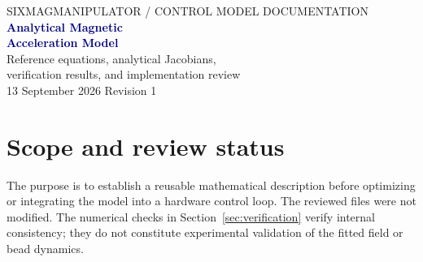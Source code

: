 \documentclass[11pt,a4paper]{article}
\numberwithin{equation}{section}
\newcommand{\code}[1]{\texttt{\detokenize{#1}}}
\begin{document}
\thispagestyle{empty}
\begin{center}
{\small\textcolor{slate}{SIXMAGMANIPULATOR \quad / \quad CONTROL MODEL DOCUMENTATION}}\\[8mm]
{\LARGE\bfseries\textcolor{navy}{Analytical Magnetic\\[2mm] Acceleration Model}}\\[5mm]
{\large Reference equations, analytical Jacobians,\\[1mm]
verification results, and implementation review}\\[6mm]
{\small 13 September 2026 \qquad Revision 1}
\end{center}
\vspace{4mm}
\begin{abstract}
\noindent
This report reconstructs the model implemented by the nine MATLAB functions
and two data files in \code{scr/_control/__refmod}. The active model represents
each permanent magnet by 144 fitted point sources, transforms their fields
into the workspace frame, and obtains magnetic acceleration from the gradient
of a scaled field energy. Position and magnet-angle Jacobians are analytical.
Read-only MATLAB checks support the consistency of the active implementation
at sampled configurations. The report records coordinate conventions, required
parameters, derivative formulas, verification results, and opportunities to
avoid repeated calculations. The inactive dipole branch contains derivative
inconsistencies and is documented separately. Physical field units and the
mapping between model angle zero and the GUI pole orientation remain subject
to confirmation.
\end{abstract}

\section{Scope and review status}
\label{sec:scope}
The purpose is to establish a reusable mathematical description before
optimizing or integrating the model into a hardware control loop. The reviewed
files were not modified. The numerical checks in Section~\ref{sec:verification}
verify internal consistency; they do not constitute experimental validation
of the fitted field or bead dynamics.
\end{document}
